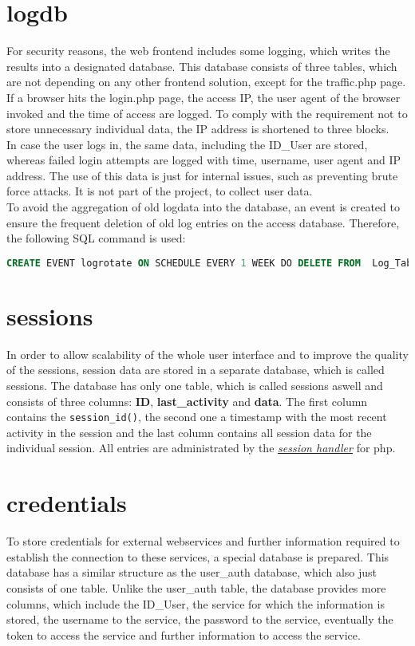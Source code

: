 \section{logdb}
For security reasons, the web frontend includes some logging, which writes the results into a designated database. This database consists of three tables, which are not depending 
on any other frontend solution, except for the traffic.php page. If a browser hits the login.php page, the access IP, the user agent of the browser invoked and the time of access 
are logged. To comply with the requirement not to store unnecessary individual data, the IP address is shortened to three blocks.\\
In case the user logs in, the same data, including the ID\_User are stored, whereas failed login attempts are logged with time, username, user agent and IP address. The use of 
this data is just for internal issues, such as preventing brute force attacks. It is not part of the project, to collect user data.\\
To avoid the aggregation of old logdata into the database, an event is created to ensure the frequent deletion of old log entries on the access database. Therefore, the 
following SQL command is used:
\begin{lstlisting}[language=sql]
CREATE EVENT logrotate ON SCHEDULE EVERY 1 WEEK DO DELETE FROM  Log_Table WHERE time < NOW() - 60*60*24*7;
\end{lstlisting}

\section{sessions}\label{sessions_database}
In order to allow scalability of the whole user interface and to improve the quality of the sessions, session data are stored in a separate database, which is called sessions. 
The database has only one table, which is called sessions aswell and consists of three columns: \textbf{ID}, \textbf{last\_activity} and \textbf{data}. The first column contains the 
\texttt{session\_id()}, the second one a timestamp with the most recent activity in the session and the last column contains all session data for the individual session. 
All entries are administrated by the \hyperref[session-handler]{\textit{session handler}} for php.

\section{credentials}
To store credentials for external webservices and further information required to establish the connection to these services, a special database is prepared. This database has a similar structure as the user\_auth database, which also just consists of one table. Unlike the user\_auth table, the database provides more columns, which include the ID\_User, the service for which the information is stored, the username to the service, the password to the service, eventually the token to access the service and further information to access the service. 
